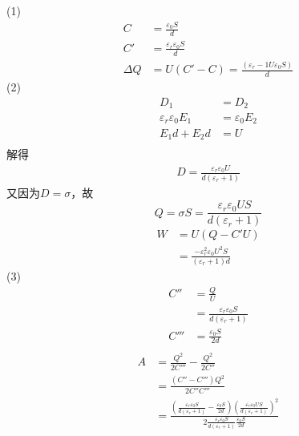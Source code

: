 \documentclass{phyasgn}
\begin{document}
\begin{sol}
  (1)
  $$\begin{aligned}
    C&=\frac{\varepsilon_0S}{d}\\
    C'&=\frac{\varepsilon_r\varepsilon_0S}{d}\\
    \Delta Q&=U(C'-C)=\frac{(\varepsilon_r-1U\varepsilon_0S)}{d}
  \end{aligned}$$
  (2)$$\begin{aligned}
    D_1&=D_2\\
    \varepsilon_r\varepsilon_0E_1&=\varepsilon_0E_2\\
    E_1d+E_2d&=U\\
  \end{aligned}$$
  解得
  $$\begin{aligned}
    D=\frac{\varepsilon_r\varepsilon_0U}{d(\varepsilon_r+1)}
  \end{aligned}$$
  又因为$D=\sigma$，故
  $$Q=\sigma S=\frac{\varepsilon_r\varepsilon_0US}{d(\varepsilon_r+1)}$$
  $$\begin{aligned}
    W&=U(Q-C'U)\\
    &=\frac{-\varepsilon_r^2\varepsilon_0U^2S}{(\varepsilon_r+1)d}
  \end{aligned}$$
  (3)$$\begin{aligned}
    C''&=\frac{Q}{U}\\
    &=\frac{\varepsilon_r\varepsilon_0S}{d(\varepsilon_r+1)}\\
    C'''&=\frac{\varepsilon_0S}{2d}\\
  \end{aligned}$$
  $$\begin{aligned}
    A&=\frac{Q^2}{2C'''}-\frac{Q^2}{2C''}\\
    &=\frac{(C''-C''')Q^2}{2C''C'''}\\
    &=\frac{(\frac{\varepsilon_r\varepsilon_0S}{d(\varepsilon_r+1)}-\frac{\varepsilon_0S}{2d})(\frac{\varepsilon_r\varepsilon_0US}{d(\varepsilon_r+1)})^2}{2\frac{\varepsilon_r\varepsilon_0S}{d(\varepsilon_r+1)}\frac{\varepsilon_0S}{2d}}
  \end{aligned}$$
\end{sol}
\end{document}
